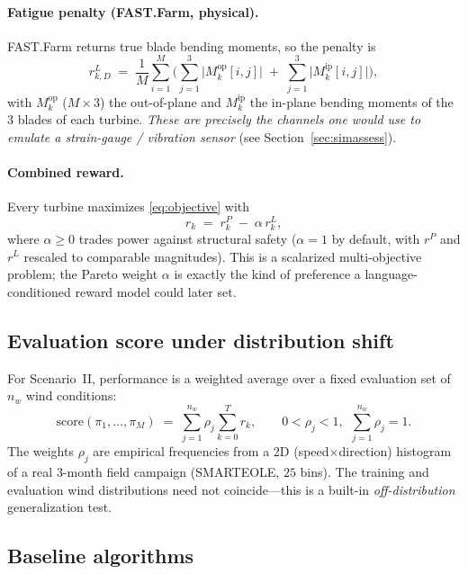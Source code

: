 \documentclass[11pt]{article}
\theoremstyle{plain}
\theoremstyle{definition}
\begin{document}
\paragraph{Fatigue penalty (FAST.Farm, physical).} FAST.Farm returns true
blade bending moments, so the penalty is
\begin{equation}
  r^{L}_{k,D} \;=\; \frac{1}{M}\sum_{i=1}^{M}
  \Bigg(\sum_{j=1}^{3}\big|M^{\text{op}}_k[i,j]\big|
      \;+\;\sum_{j=1}^{3}\big|M^{\text{ip}}_k[i,j]\big|\Bigg),
  \label{eq:dloadproxy}
\end{equation}
with $M^{\text{op}}_k$ ($M \times 3$) the out-of-plane and $M^{\text{ip}}_k$
the in-plane bending moments of the $3$ blades of each turbine. \emph{These
are precisely the channels one would use to emulate a strain-gauge / vibration
sensor} (see Section~\ref{sec:simassess}).

\paragraph{Combined reward.} Every turbine maximizes \eqref{eq:objective} with
\begin{equation}
  r_k \;=\; r^{P}_k \;-\; \alpha\, r^{L}_k,
  \label{eq:combined}
\end{equation}
where $\alpha\ge 0$ trades power against structural safety ($\alpha=1$ by
default, with $r^P$ and $r^L$ rescaled to comparable magnitudes). This is a
scalarized multi-objective problem; the Pareto weight $\alpha$ is exactly the
kind of preference a language-conditioned reward model could later set.

\subsection{Evaluation score under distribution shift}

For Scenario~II, performance is a weighted average over a fixed evaluation set
of $n_w$ wind conditions:
\begin{equation}
  \mathrm{score}(\pi_1,\dots,\pi_M)
  \;=\;\sum_{j=1}^{n_w}\rho_j\sum_{k=0}^{T} r_k,
  \qquad 0<\rho_j<1,\ \ \sum_{j=1}^{n_w}\rho_j=1.
  \label{eq:score}
\end{equation}
The weights $\rho_j$ are empirical frequencies from a 2D (speed$\times$direction)
histogram of a real $3$-month field campaign (SMARTEOLE, $25$ bins). The
training and evaluation wind distributions need not coincide---this is a built-in
\emph{off-distribution} generalization test.

\subsection{Baseline algorithms}
\end{document}
